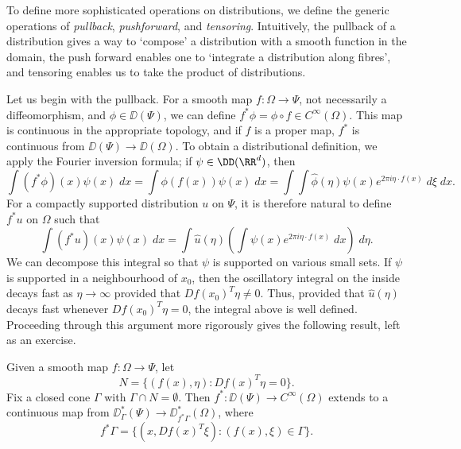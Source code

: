 To define more sophisticated operations on distributions, we define the generic operations of \emph{pullback}, \emph{pushforward}, and \emph{tensoring}. Intuitively, the pullback of a distribution gives a way to `compose' a distribution with a smooth function in the domain, the push forward enables one to `integrate a distribution along fibres', and tensoring enables us to take the product of distributions.

Let us begin with the pullback. For a smooth map $f: \Omega \to \Psi$, not necessarily a diffeomorphism, and $\phi \in \DD(\Psi)$, we can define $f^* \phi = \phi \circ f \in C^\infty(\Omega)$. This map is continuous in the appropriate topology, and if $f$ is a proper map, $f^*$ is continuous from $\DD(\Psi) \to \DD(\Omega)$. To obtain a distributional definition, we apply the Fourier inversion formula; if $\psi \in \DD(\RR^d)$, then
%
\[ \int (f^* \phi)(x) \psi(x)\; dx = \int \phi(f(x)) \psi(x)\; dx = \int \int \widehat{\phi}(\eta) \psi(x) e^{2 \pi i \eta \cdot f(x)}\; d\xi\; dx. \]
%
For a compactly supported distribution $u$ on $\Psi$, it is therefore natural to define $f^* u$ on $\Omega$ such that
%
\[ \int (f^* u)(x) \psi(x)\; dx = \int \widehat{u}(\eta) \left( \int \psi(x) e^{2 \pi i \eta \cdot f(x)}\; dx \right)\; d\eta. \]
%
We can decompose this integral so that $\psi$ is supported on various small sets. If $\psi$ is supported in a neighbourhood of $x_0$, then the oscillatory integral on the inside decays fast as $\eta \to \infty$ provided that $Df(x_0)^T \eta \neq 0$. Thus, provided that $\widehat{u}(\eta)$ decays fast whenever $Df(x_0)^T \eta = 0$, the integral above is well defined. Proceeding through this argument more rigorously gives the following result, left as an exercise.

\begin{theorem}
    Given a smooth map $f: \Omega \to \Psi$, let
    \[ N = \{ (f(x),\eta): Df(x)^T \eta = 0 \}. \]
    Fix a closed cone $\Gamma$ with $\Gamma \cap N = \emptyset$. Then $f^*: \DD(\Psi) \to C^\infty(\Omega)$ extends to a continuous map from $\DD^*_\Gamma(\Psi) \to \DD^*_{f^* \Gamma}(\Omega)$, where
    \[ f^* \Gamma = \{ (x,Df(x)^T \xi) : (f(x), \xi) \in \Gamma \}. \]
\end{theorem}

